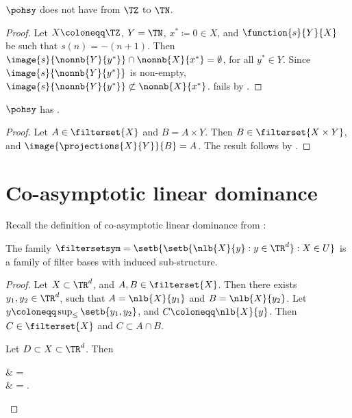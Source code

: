 \documentclass[b5paper, english, oneside]{memoir}
\begin{document}
\begin{theorem}
\label{AsymptoticInjectiveSubComposabilityFailsInZ}
$\pohsy$ does not have  from $\TZ$ to $\TN$.
\end{theorem}

\begin{proof}
Let $X \coloneqq \TZ$, $Y = \TN$, $x^* \coloneqq 0 \in X$, and $\function{s}{Y}{X}$ be such that $s(n) = -(n + 1)$. Then $\image{s}{\nonnb{Y}{y^*}} \cap \nonnb{X}{x^*} = \emptyset$, for all $y^* \in Y$. Since $\image{s}{\nonnb{Y}{y^*}}$ is non-empty, $\image{s}{\nonnb{Y}{y^*}} \not\subset \nonnb{X}{x^*}$.  fails by .
\end{proof}

\begin{theorem}
\label{AsymptoticExtensibility}
$\pohsy$ has .
\end{theorem}

\begin{proof}
Let $A \in \filterset{X}$ and $B = A \times Y$. Then $B \in \filterset{X \times Y}$, and $\image{\projections{X}{Y}}{B} = A$. The result follows by . 
\end{proof}

\section{Co-asymptotic linear dominance}
\label{CoasymptoticLinearDominance}

Recall the definition of co-asymptotic linear dominance from :

\begin{theorem}
\label{CoasymptoticLinearDominanceIsLocalLinearDominance}
The family $\filtersetsym = \setb{\setb{\nlb{X}{y} : y \in \TR^d} : X \in U}$ is a family of filter bases with induced sub-structure.
\end{theorem}

\begin{proof}
Let $X \subset \TR^d$, and $A, B \in \filterset{X}$. Then there exists $y_1, y_2 \in \TR^d$, such that $A = \nlb{X}{y_1}$ and $B = \nlb{X}{y_2}$. Let $y \coloneqq \sup_{\leq}\setb{y_1, y_2}$, and $C \coloneqq \nlb{X}{y}$. Then $C \in \filterset{X}$ and $C \subset A \cap B$. 

Let $D \subset X \subset \TR^d$. Then
\begin{eqs}
 & =  \\
{} & = . 
\end{eqs}
\end{proof}
\end{document}
